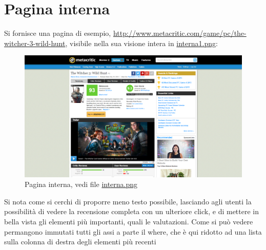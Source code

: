 \documentclass[12pt]{article}
\begin{document}
\section{Pagina interna}
Si fornisce una pagina di esempio, \url{http://www.metacritic.com/game/pc/the-witcher-3-wild-hunt}, visibile nella sua visione intera in \href{interna1.png}{interna1.png}:
\hypertarget{interna}{}
\begin{figure}[H]
	\begin{center}
		\includegraphics[width=13.5cm]{interna.png}
		\caption{Pagina interna, vedi file \href{interna.png}{interna.png}}
	\end{center}
\end{figure}
Si nota come si cerchi di proporre meno testo possibile, lasciando agli utenti la possibilità di vedere la recensione completa con un ulteriore click, e di mettere in bella vista gli elementi più importanti, quali le valutazioni.
Come si può vedere permangono immutati tutti gli assi a parte il where, che è qui ridotto ad una lista sulla colonna di destra degli elementi più recenti
\newpage
\end{document}
